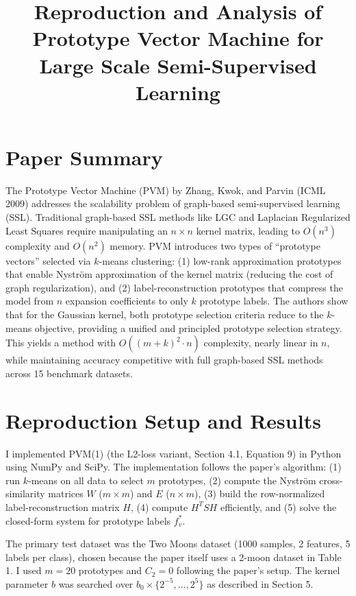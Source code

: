 \documentclass[10pt, conference]{IEEEtran}
\title{Reproduction and Analysis of Prototype Vector Machine for Large Scale Semi-Supervised Learning}
\author{
\IEEEauthorblockN{Ritesh Patil}
\IEEEauthorblockA{Roll Number: 230056 \\
NST, Rishihood University, Sonipat \\
Advanced Machine Learning --- Mid-Semester Examination, Part B}
}
\begin{document}
\maketitle

\section{Paper Summary}

The Prototype Vector Machine (PVM) by Zhang, Kwok, and Parvin (ICML 2009) addresses the scalability problem of graph-based semi-supervised learning (SSL). Traditional graph-based SSL methods like LGC and Laplacian Regularized Least Squares require manipulating an $n \times n$ kernel matrix, leading to $O(n^3)$ complexity and $O(n^2)$ memory. PVM introduces two types of ``prototype vectors'' selected via $k$-means clustering: (1) low-rank approximation prototypes that enable Nystr\"{o}m approximation of the kernel matrix (reducing the cost of graph regularization), and (2) label-reconstruction prototypes that compress the model from $n$ expansion coefficients to only $k$ prototype labels. The authors show that for the Gaussian kernel, both prototype selection criteria reduce to the $k$-means objective, providing a unified and principled prototype selection strategy. This yields a method with $O((m+k)^2 \cdot n)$ complexity, nearly linear in $n$, while maintaining accuracy competitive with full graph-based SSL methods across 15 benchmark datasets.

\section{Reproduction Setup and Results}

I implemented PVM(1) (the L2-loss variant, Section 4.1, Equation 9) in Python using NumPy and SciPy. The implementation follows the paper's algorithm: (1) run $k$-means on all data to select $m$ prototypes, (2) compute the Nystr\"{o}m cross-similarity matrices $W$ ($m \times m$) and $E$ ($n \times m$), (3) build the row-normalized label-reconstruction matrix $H$, (4) compute $H^T S H$ efficiently, and (5) solve the closed-form system for prototype labels $f_v^*$.

The primary test dataset was the Two Moons dataset (1000 samples, 2 features, 5 labels per class), chosen because the paper itself uses a 2-moon dataset in Table 1. I used $m = 20$ prototypes and $C_2 = 0$ following the paper's setup. The kernel parameter $b$ was searched over $b_0 \times \{2^{-5}, \ldots, 2^5\}$ as described in Section 5.
\end{document}
